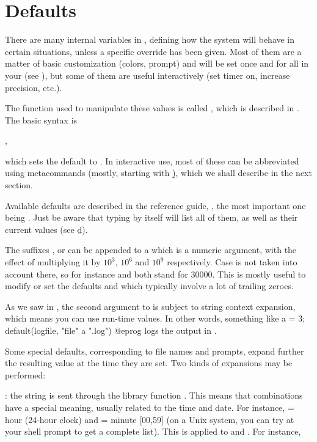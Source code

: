 \section{Defaults}
\label{se:defaults}

\noindent There are many internal variables in , defining how the
system will behave in certain situations, unless a specific override has been
given. Most of them are a matter of basic customization (colors, prompt) and
will be set once and for all in your  (see
), but some of them are useful interactively (set timer on,
increase precision, etc.).

The function used to manipulate these values is called , which
is described in . The basic syntax is

,

\noindent which sets the default  to . In interactive
use, most of these can be abbreviated using  metacommands
(mostly, starting with \b), which we shall describe in the next section.

Available defaults are described in the reference guide,
, the most important one being .
Just be aware that typing  by itself will list all of them, as
well as their current values (see \b{d}).

 The suffixes ,  or  can be appended to
a  which is a numeric argument, with the effect of multiplying it
by $10^3$, $10^6$ and $10^9$ respectively. Case is not taken into account
there, so for instance  and  both stand for $30000$. This
is mostly useful to modify or set the defaults  and
 which typically involve a lot of trailing zeroes.

 As we saw in ,
the second argument to  is subject to string context
expansion, which means you can use run-time values. In other words, something
like
\bprog
  a = 3;
  default(logfile, "file" a ".log")
@eprog
logs the output in .

Some special defaults, corresponding to file names and prompts, expand further
the resulting value at the time they are set. Two kinds of expansions may be
performed:

\item {}: the string is sent through the library
function . This means that \kbd{\%} combinations have
a special meaning, usually related to the time and date. For instance,
 = hour (24-hour clock) and  = minute [00,59] (on a Unix
system, you can try  at your shell prompt to get a complete
list). This is applied to  and . For
instance,

